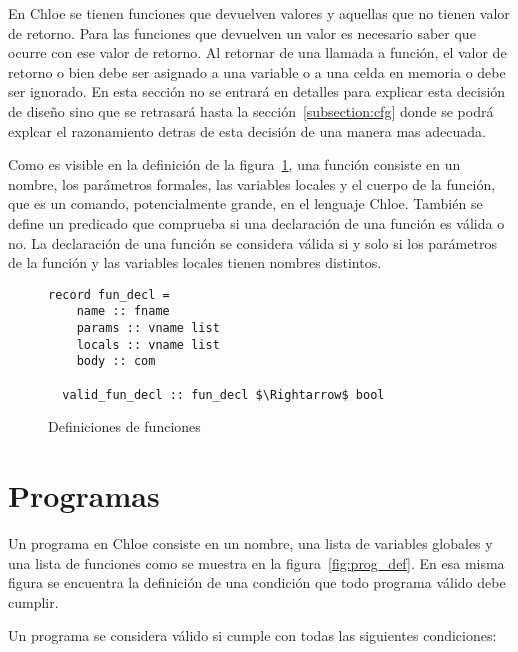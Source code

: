 En Chloe se tienen funciones que devuelven valores y aquellas que no tienen valor de retorno.
Para las funciones que devuelven un valor es necesario saber que ocurre con ese valor de retorno.
Al retornar de una llamada a función, el valor de retorno o bien debe ser asignado a una variable o a una celda en memoria o debe ser ignorado.
En esta sección no se entrará en detalles para explicar esta decisión de diseño sino que se retrasará hasta la sección~\ref{subsection:cfg} donde se podrá explcar el razonamiento detras de esta decisión de una manera mas adecuada.

Como es visible en la definición de la figura~\ref{fig:fun_def}, una función consiste en un nombre, los parámetros formales, las variables locales y el cuerpo de la función, que es un comando, potencialmente grande, en el lenguaje Chloe.
También se define un predicado que comprueba si una declaración de una función es válida o no.
La declaración de una función se considera válida si y solo si los parámetros de la función y las variables locales tienen nombres distintos.

\begin{figure}
  \begin{lstlisting}[frame=single, mathescape=true]
  record fun_decl =
    name :: fname
    params :: vname list
    locals :: vname list
    body :: com

  valid_fun_decl :: fun_decl $\Rightarrow$ bool
  \end{lstlisting}

  \caption{Definiciones de funciones}
  \label{fig:fun_def}
\end{figure}

\section{Programas}\label{section:programs_commands}

Un programa en Chloe consiste en un nombre, una lista de variables globales y una lista de funciones como se muestra en la figura~\ref{fig:prog_def}.
En esa misma figura se encuentra la definición de una condición que todo programa válido debe cumplir.

Un programa se considera válido si cumple con todas las siguientes condiciones:


